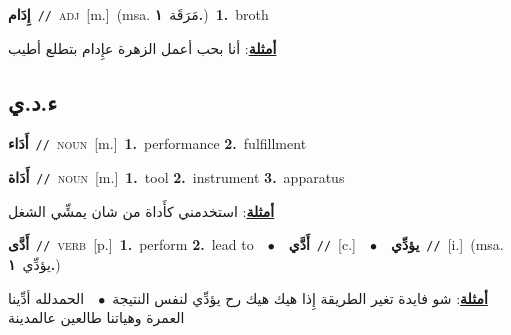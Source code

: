 \documentclass[10pt,a4paper,twoside]{article} %
\begin{document}
\begin{multicols}{2}
{\setlength\topsep{0pt}\textbf{\foreignlanguage{arabic}{إِدَام}}\ {\color{gray}\texttt{//}\color{black}}\ \textsc{adj}\ [m.]\ \color{gray}(msa. \foreignlanguage{arabic}{مَرَقَة}~\foreignlanguage{arabic}{\textbf{١.}})\color{black}\ \textbf{1.}~broth\  \begin{flushright}\color{gray}\foreignlanguage{arabic}{\textbf{\underline{\foreignlanguage{arabic}{أمثلة}}}: أنا بحب أعمل الزهرة عإِدام بتطلع أطيب}\end{flushright}\color{black}} \vspace{2mm}

\vspace{-3mm}
\subsection*{\color{blue}\foreignlanguage{arabic}{ء.د.ي}\color{blue}{}} 

{\setlength\topsep{0pt}\textbf{\foreignlanguage{arabic}{أَدَاء}}\ {\color{gray}\texttt{//}\color{black}}\ \textsc{noun}\ [m.]\ \textbf{1.}~performance  \textbf{2.}~fulfillment\ } \vspace{2mm}

{\setlength\topsep{0pt}\textbf{\foreignlanguage{arabic}{أَدَاة}}\ {\color{gray}\texttt{//}\color{black}}\ \textsc{noun}\ [m.]\ \textbf{1.}~tool  \textbf{2.}~instrument  \textbf{3.}~apparatus\  \begin{flushright}\color{gray}\foreignlanguage{arabic}{\textbf{\underline{\foreignlanguage{arabic}{أمثلة}}}: استخدمني كأَداة من شان يمشِّي الشغل}\end{flushright}\color{black}} \vspace{2mm}

{\setlength\topsep{0pt}\textbf{\foreignlanguage{arabic}{أَدَّى}}\ {\color{gray}\texttt{//}\color{black}}\ \textsc{verb}\ [p.]\ \textbf{1.}~perform  \textbf{2.}~lead to\ \ $\bullet$\ \ \setlength\topsep{0pt}\textbf{\foreignlanguage{arabic}{أَدَّي}}\ {\color{gray}\texttt{//}\color{black}}\ [c.]\ \ $\bullet$\ \ \setlength\topsep{0pt}\textbf{\foreignlanguage{arabic}{يؤدِّي}}\ {\color{gray}\texttt{//}\color{black}}\ [i.]\ \color{gray}(msa. \foreignlanguage{arabic}{يؤدِّي}~\foreignlanguage{arabic}{\textbf{١.}})\color{black}\  \begin{flushright}\color{gray}\foreignlanguage{arabic}{\textbf{\underline{\foreignlanguage{arabic}{أمثلة}}}: شو فايدة تغير الطريقة إِذا هيك هيك رح يؤدِّي لنفس النتيجة\ $\bullet$\ \  الحمدلله أدِّينا العمرة وهياتنا طالعين عالمدينة}\end{flushright}\color{black}} \vspace{2mm}


\end{multicols}
\end{document}
